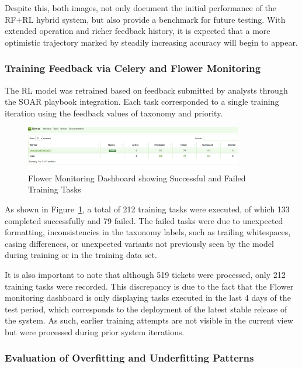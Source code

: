 Despite this, both images, not only document the initial performance of the RF+RL hybrid system, but also provide a benchmark for future testing. 
With extended operation and richer feedback history, it is expected that a more optimistic trajectory marked by steadily increasing accuracy will begin to appear.

\subsubsection{Training Feedback via Celery and Flower Monitoring}

The RL model was retrained based on feedback submitted by analysts through the SOAR playbook integration. 
Each task corresponded to a single training iteration using the feedback values of taxonomy and priority.

\begin{figure}[h!]
    \centering
    \includegraphics[width=0.85\textwidth]{ch4/assets/flower_ui_feedback.png}
    \caption{Flower Monitoring Dashboard showing Successful and Failed Training Tasks}
    \label{fig:flower_ui_feedback}
\end{figure}

As shown in Figure~\ref{fig:flower_ui_feedback}, a total of 212 training tasks were executed, of which 133 completed successfully and 79 failed. 
The failed tasks were due to unexpected formatting, inconsistencies in the taxonomy labels, such as trailing whitespaces, casing differences, or unexpected variants not previously seen by the model during training or in the training data set.

It is also important to note that although 519 tickets were processed, only 212 training tasks were recorded. 
This discrepancy is due to the fact that the Flower monitoring dashboard is only displaying tasks executed in the last 4 days of the test period, which corresponds to the deployment of the latest stable release of the system. 
As such, earlier training attempts are not visible in the current view but were processed during prior system iterations.

\subsubsection{Evaluation of Overfitting and Underfitting Patterns}

